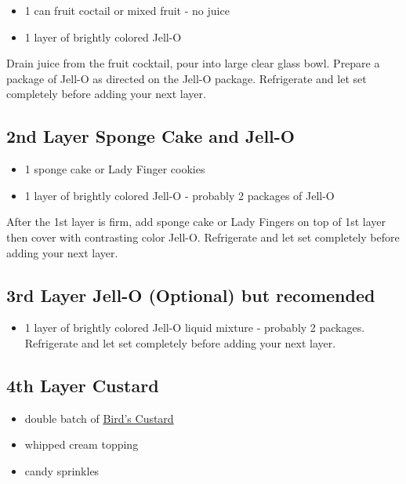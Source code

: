\documentclass[
]{book}
\providecommand{\tightlist}{%
  \setlength{\itemsep}{0pt}\setlength{\parskip}{0pt}}
\begin{document}
\begin{itemize}
\tightlist
\item
  1 can fruit coctail or mixed fruit - no juice
\item
  1 layer of brightly colored Jell-O
\end{itemize}

Drain juice from the fruit cocktail, pour into large clear glass bowl. Prepare a package of Jell-O as directed on the Jell-O package. Refrigerate and let set completely before adding your next layer.

\hypertarget{nd-layer-sponge-cake-and-jell-o}{%
\subsection*{2nd Layer Sponge Cake and Jell-O}\label{nd-layer-sponge-cake-and-jell-o}}


\begin{itemize}
\tightlist
\item
  1 sponge cake or Lady Finger cookies
\item
  1 layer of brightly colored Jell-O - probably 2 packages of Jell-O
\end{itemize}

After the 1st layer is firm, add sponge cake or Lady Fingers on top of 1st layer then cover with contrasting color Jell-O. Refrigerate and let set completely before adding your next layer.

\hypertarget{rd-layer-jell-o-optional-but-recomended}{%
\subsection*{3rd Layer Jell-O (Optional) but recomended}\label{rd-layer-jell-o-optional-but-recomended}}


\begin{itemize}
\tightlist
\item
  1 layer of brightly colored Jell-O liquid mixture - probably 2 packages. Refrigerate and let set completely before adding your next layer.
\end{itemize}

\hypertarget{th-layer-custard}{%
\subsection*{4th Layer Custard}\label{th-layer-custard}}


\begin{itemize}
\tightlist
\item
  double batch of \href{https://en.wikipedia.org/wiki/Bird\%27s_Custard}{Bird's Custard}
\item
  whipped cream topping
\item
  candy sprinkles
\end{itemize}
\end{document}
